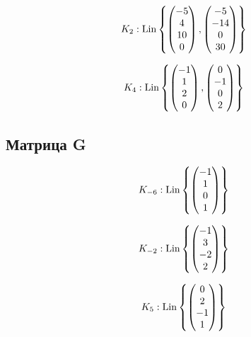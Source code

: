 \documentclass[12pt, a4paper]{article}
\begin{document}
    \begin{equation}
        K_2: \operatorname{Lin} \left\{\begin{pmatrix} -5\\4\\10\\0 \end{pmatrix}, \begin{pmatrix} -5\\-14\\0\\30 \end{pmatrix} \right\}
    \end{equation}

    \begin{equation}
        K_4: \operatorname{Lin} \left\{\begin{pmatrix} -1\\1\\2\\0 \end{pmatrix}, \begin{pmatrix} 0\\-1\\0\\2 \end{pmatrix} \right\}
    \end{equation}


    \subsection{Матрица G}


    \begin{equation}
        K_{-6}: \operatorname{Lin} \left\{\begin{pmatrix} -1\\1\\0\\1 \end{pmatrix} \right\}
    \end{equation}

    
    \begin{equation}
        K_{-2}: \operatorname{Lin} \left\{\begin{pmatrix} -1\\3\\-2\\2 \end{pmatrix} \right\}
    \end{equation}


    \begin{equation}
        K_{5}: \operatorname{Lin} \left\{\begin{pmatrix} 0\\2\\-1\\1 \end{pmatrix} \right\}
    \end{equation}
\end{document}
